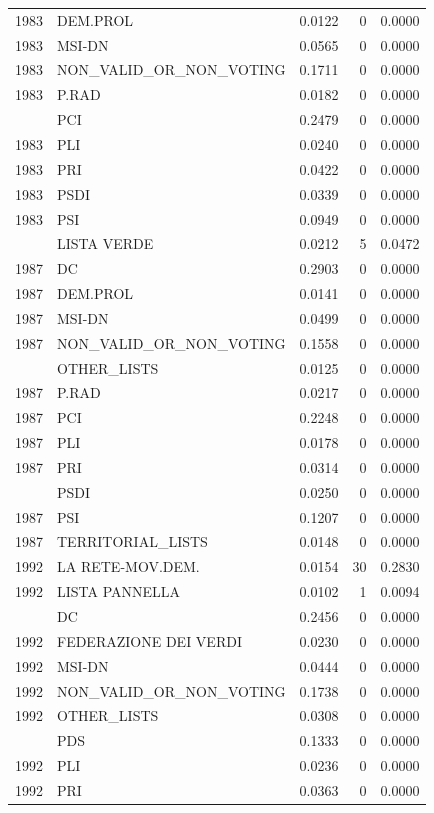 \begin{longtable}[t]{rlrrr}
1983 & DEM.PROL & 0.0122 & 0 & 0.0000\\
1983 & MSI-DN & 0.0565 & 0 & 0.0000\\
1983 & NON\_VALID\_OR\_NON\_VOTING & 0.1711 & 0 & 0.0000\\
1983 & P.RAD & 0.0182 & 0 & 0.0000\\
\addlinespace
1983 & PCI & 0.2479 & 0 & 0.0000\\
1983 & PLI & 0.0240 & 0 & 0.0000\\
1983 & PRI & 0.0422 & 0 & 0.0000\\
1983 & PSDI & 0.0339 & 0 & 0.0000\\
1983 & PSI & 0.0949 & 0 & 0.0000\\
\addlinespace
1987 & LISTA VERDE & 0.0212 & 5 & 0.0472\\
1987 & DC & 0.2903 & 0 & 0.0000\\
1987 & DEM.PROL & 0.0141 & 0 & 0.0000\\
1987 & MSI-DN & 0.0499 & 0 & 0.0000\\
1987 & NON\_VALID\_OR\_NON\_VOTING & 0.1558 & 0 & 0.0000\\
\addlinespace
1987 & OTHER\_LISTS & 0.0125 & 0 & 0.0000\\
1987 & P.RAD & 0.0217 & 0 & 0.0000\\
1987 & PCI & 0.2248 & 0 & 0.0000\\
1987 & PLI & 0.0178 & 0 & 0.0000\\
1987 & PRI & 0.0314 & 0 & 0.0000\\
\addlinespace
1987 & PSDI & 0.0250 & 0 & 0.0000\\
1987 & PSI & 0.1207 & 0 & 0.0000\\
1987 & TERRITORIAL\_LISTS & 0.0148 & 0 & 0.0000\\
1992 & LA RETE-MOV.DEM. & 0.0154 & 30 & 0.2830\\
1992 & LISTA PANNELLA & 0.0102 & 1 & 0.0094\\
\addlinespace
1992 & DC & 0.2456 & 0 & 0.0000\\
1992 & FEDERAZIONE DEI VERDI & 0.0230 & 0 & 0.0000\\
1992 & MSI-DN & 0.0444 & 0 & 0.0000\\
1992 & NON\_VALID\_OR\_NON\_VOTING & 0.1738 & 0 & 0.0000\\
1992 & OTHER\_LISTS & 0.0308 & 0 & 0.0000\\
\addlinespace
1992 & PDS & 0.1333 & 0 & 0.0000\\
1992 & PLI & 0.0236 & 0 & 0.0000\\
1992 & PRI & 0.0363 & 0 & 0.0000\\

\end{longtable}
